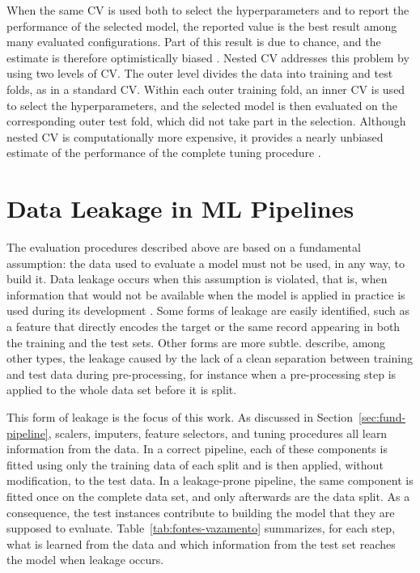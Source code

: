 When the same CV is used both to select the hyperparameters and to report the
performance of the selected model, the reported value is the best result among
many evaluated configurations. Part of this result is due to chance, and the
estimate is therefore optimistically biased \cite{varma2006,cawley2010}. Nested
CV addresses this problem by using two levels of CV. The outer level divides the
data into training and test folds, as in a standard CV. Within each outer
training fold, an inner CV is used to select the hyperparameters, and the
selected model is then evaluated on the corresponding outer test fold, which did
not take part in the selection. Although nested CV is computationally more
expensive, it provides a nearly unbiased estimate of the performance of the
complete tuning procedure \cite{varma2006}.

\section{Data Leakage in ML Pipelines}
\label{sec:fund-vazamento}

The evaluation procedures described above are based on a fundamental
assumption: the data used to evaluate a model must not be used, in any way, to
build it. Data leakage occurs when this assumption is violated, that is, when
information that would not be available when the model is applied in practice is
used during its development \cite{kaufman2012}. Some forms of leakage are easily
identified, such as a feature that directly encodes the target or the same
record appearing in both the training and the test sets. Other forms are more
subtle.  describe, among other types, the leakage caused
by the lack of a clean separation between training and test data during
pre-processing, for instance when a pre-processing step is applied to the whole
data set before it is split.

This form of leakage is the focus of this work. As discussed in
Section~\ref{sec:fund-pipeline}, scalers, imputers, feature selectors, and tuning
procedures all learn information from the data. In a correct pipeline, each of
these components is fitted using only the training data of each split and is
then applied, without modification, to the test data. In a leakage-prone
pipeline, the same component is fitted once on the complete data set, and only
afterwards are the data split. As a consequence, the test instances contribute
to building the model that they are supposed to evaluate.
Table~\ref{tab:fontes-vazamento} summarizes, for each step, what is learned from
the data and which information from the test set reaches the model when leakage
occurs.

